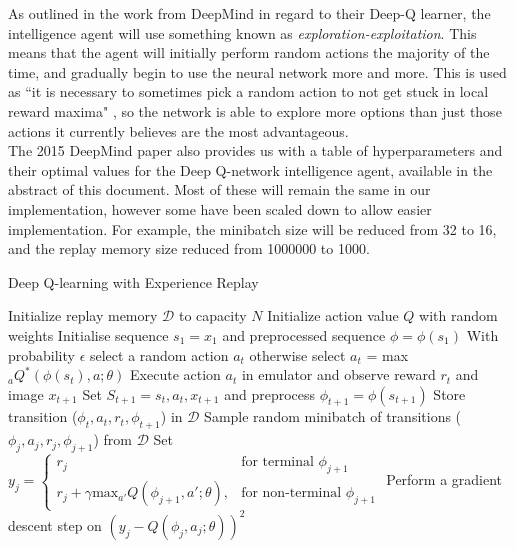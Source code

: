 \documentclass[10pt]{article}
\begin{document}
		As outlined in the work from DeepMind in regard to their Deep-Q learner, the intelligence agent will use something known as \textit{exploration-exploitation}. This means that the agent will initially perform random actions the majority of the time, and gradually begin to use the neural network more and more. This is used as ``it is necessary to sometimes pick a random action to not get stuck in local reward maxima" \cite{repli}, so the network is able to explore more options than just those actions it currently believes are the most advantageous.\\
		
		The 2015 DeepMind paper also provides us with a table of hyperparameters and their optimal values for the Deep Q-network intelligence agent, available in the abstract of this document. Most of these will remain the same in our implementation, however some have been scaled down to allow easier implementation. For example, the minibatch size will be reduced from 32 to 16, and the replay memory size reduced from 1000000 to 1000.
		
		\begin{algorithm}
			\caption{Deep Q-learning with Experience Replay \cite{humanlevel}}
			\label{algo:agentAlgo}
			\begin{algorithmic}[]
				\State Initialize replay memory $\mathcal{D}$ to capacity $N$
				\State Initialize action value $Q$ with random weights				
					\State Initialise sequence $s_1 = {x_1}$ and preprocessed sequence $\phi = \phi(s_1)$
						\State With probability $\epsilon$ select a random action $a_t$
						\State otherwise select $a_t$ = max$_aQ^*(\phi(s_t),a;\theta)$
						\State Execute action $a_t$ in emulator and observe reward $r_t$ and image $x_{t+1}$
						\State Set $S_{t+1} = s_t,a_t,x_{t+1}$ and preprocess $\phi_{t+1} = \phi(s_{t+1})$
						\State Store transition ($\phi_t,a_t,r_t,\phi_{t+1}$) in $\mathcal{D}$
						\State Sample random minibatch of transitions ($\phi_j,a_j,r_j,\phi_{j+1}$) from $\mathcal{D}$
						\State Set $y_j =
							\begin{cases}
   								r_j& \text{for terminal } \phi_{j+1}\\
    							r_j + \gamma \text{max}_{a'}Q(\phi_{j+1},a';\theta),& \text{for non-terminal } \phi_{j+1}
							\end{cases}$
						\State Perform a gradient descent step on $(y_j - Q(\phi_j,a_j;\theta))^2$
					\EndFor
				\EndFor
			\end{algorithmic}
		\end{algorithm}
	
\end{document}
